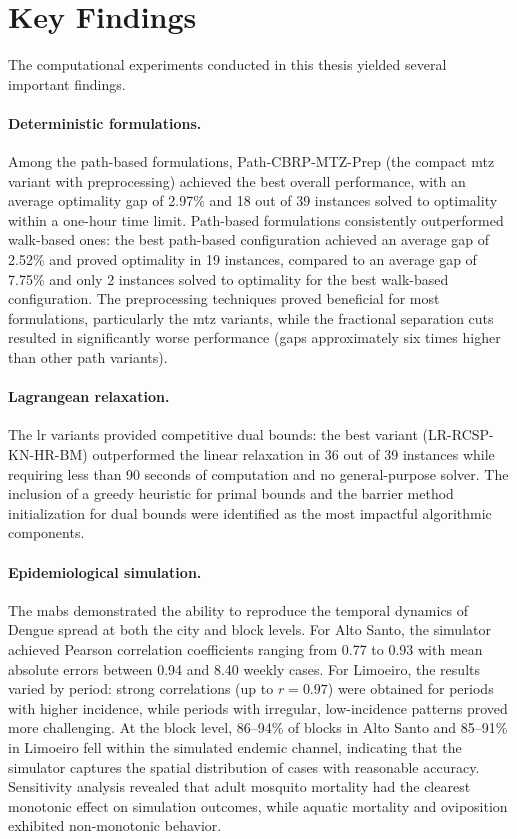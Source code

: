 \section{Key Findings}

The computational experiments conducted in this thesis yielded several
important findings.

\paragraph{Deterministic formulations.}
Among the path-based formulations, Path-CBRP-MTZ-Prep (the compact \gls{mtz}
variant with preprocessing) achieved the best overall performance, with an
average optimality gap of 2.97\% and 18 out of 39 instances solved to
optimality within a one-hour time limit. Path-based formulations consistently
outperformed walk-based ones: the best path-based configuration achieved an
average gap of 2.52\% and proved optimality in 19 instances, compared to an
average gap of 7.75\% and only 2 instances solved to optimality for the best
walk-based configuration. The preprocessing techniques proved beneficial for
most formulations, particularly the \gls{mtz} variants, while the fractional
separation cuts resulted in significantly worse performance (gaps approximately
six times higher than other path variants).

\paragraph{Lagrangean relaxation.}
The \gls{lr} variants provided competitive dual bounds: the best variant
(LR-RCSP-KN-HR-BM) outperformed the linear relaxation in 36 out of 39
instances while requiring less than 90 seconds of computation and no
general-purpose solver. The inclusion of a greedy heuristic for primal bounds
and the barrier method initialization for dual bounds were identified as the
most impactful algorithmic components.

\paragraph{Epidemiological simulation.}
The \gls{mabs} demonstrated the ability to reproduce the temporal dynamics of
Dengue spread at both the city and block levels. For Alto Santo, the simulator
achieved Pearson correlation coefficients ranging from 0.77 to 0.93 with mean
absolute errors between 0.94 and 8.40 weekly cases. For Limoeiro, the results
varied by period: strong correlations (up to $r = 0.97$) were obtained for
periods with higher incidence, while periods with irregular, low-incidence
patterns proved more challenging. At the block level, 86--94\% of blocks in
Alto Santo and 85--91\% in Limoeiro fell within the simulated endemic channel,
indicating that the simulator captures the spatial distribution of cases with
reasonable accuracy. Sensitivity analysis revealed that adult mosquito mortality
had the clearest monotonic effect on simulation outcomes, while aquatic
mortality and oviposition exhibited non-monotonic behavior.

